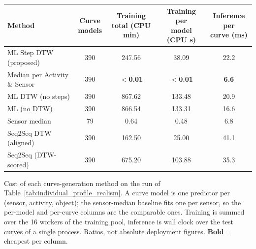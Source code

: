 \vspace{1em}

\noindent
\begin{minipage}{\textwidth}
\centering

\captionsetup{
    justification=centering,
    singlelinecheck=false,
    format=plain
}

\label{tab:timing_results}

\vspace{-0.5em}

\small
\begin{tabularx}{\linewidth}{>{\raggedright\arraybackslash}X|c|c|c|c}
\toprule
Method & \makecell{Curve\\models} & \makecell{Training\\total (CPU min)} & \makecell{Training per\\model (CPU s)} & \makecell{Inference per\\curve (ms)} \\
\midrule
ML Step DTW (proposed) & 390 & 247.56 & 38.09 & 22.2 \\
Median per Activity \& Sensor & 390 & \textbf{$<$0.01} & \textbf{$<$0.01} & \textbf{6.6} \\
ML DTW (no steps) & 390 & 867.62 & 133.48 & 20.9 \\
ML (no DTW) & 390 & 866.54 & 133.31 & 16.6 \\
Sensor median & 79 & 0.64 & 0.48 & 6.8 \\
Seq2Seq DTW (aligned) & 390 & 162.50 & 25.00 & 41.1 \\
Seq2Seq (DTW-scored) & 390 & 675.20 & 103.88 & 35.3 \\
\bottomrule
\end{tabularx}

\vspace{0.5em}

\parbox{\linewidth}{%
\footnotesize
Cost of each curve-generation method on the run of Table~\ref{tab:individual_profile_realism}. A curve model is one predictor per (sensor, activity, object); the sensor-median baseline fits one per sensor, so the per-model and per-curve columns are the comparable ones. Training is summed over the 16 workers of the training pool, inference is wall clock over the test curves of a single process. Ratios, not absolute deployment figures. \textbf{Bold} = cheapest per column.
}

\end{minipage}

\vspace{1em}
